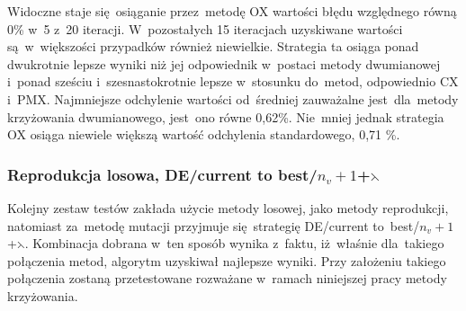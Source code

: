 \begin{itemize}
Widoczne staje się~osiąganie przez~metodę OX wartości błędu względnego równą 0\% w~5 z~20 iteracji. W~pozostałych 15 iteracjach uzyskiwane wartości są~w~większości przypadków również niewielkie. Strategia ta osiąga ponad dwukrotnie lepsze wyniki niż jej odpowiednik w~postaci metody dwumianowej i~ponad sześciu i~szesnastokrotnie lepsze w~stosunku do~metod, odpowiednio CX i~PMX. Najmniejsze odchylenie wartości od~średniej zauważalne jest~dla~metody krzyżowania dwumianowego, jest~ono równe 0,62\%. Nie~mniej jednak strategia OX osiąga niewiele większą wartość odchylenia standardowego, 0,71 \%.

\begin{table}[h!]
\begin{center}
\caption{Ranking metod krzyżowania na podstawie średniej wartości błędu względnego funkcji celu, reprodukcja losowa,  mutacja DE/rand/1, 50 000 iteracji.}
\label{rankingcross2}
\end{center}
\end{table}



\end{itemize}

\subsubsection{Reprodukcja losowa, DE/current to best/$n_{v}+1$+$\leftthreetimes$}

Kolejny zestaw testów zakłada użycie metody losowej, jako metody reprodukcji, natomiast za~metodę mutacji przyjmuje się~strategię DE/current to~best/$n_{v}+1$+$\leftthreetimes$. Kombinacja dobrana w~ten sposób wynika z~faktu, iż~właśnie dla~takiego połączenia metod, algorytm uzyskiwał najlepsze wyniki. Przy założeniu takiego połączenia zostaną przetestowane rozważane w~ramach niniejszej pracy metody krzyżowania.

